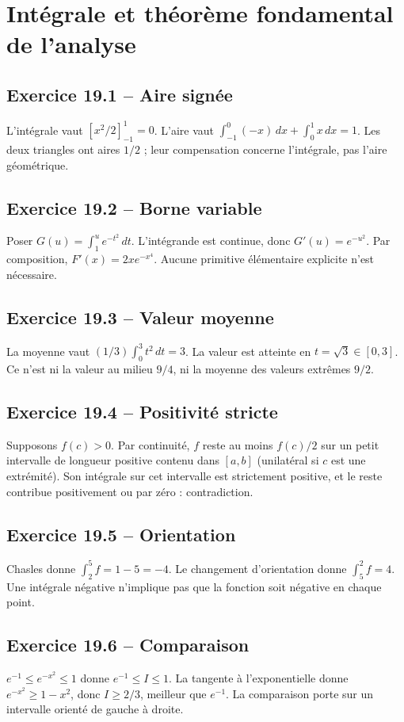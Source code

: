 \chapter{Intégrale et théorème fondamental de l’analyse}
\section*{Exercice 19.1 -- Aire signée}
L'intégrale vaut $[x^2/2]_{-1}^1=0$. L'aire vaut $\int_{-1}^0(-x)\,dx+\int_0^1x\,dx=1$. Les deux triangles ont aires $1/2$ ; leur compensation concerne l'intégrale, pas l'aire géométrique.

\section*{Exercice 19.2 -- Borne variable}
Poser $G(u)=\int_1^ue^{-t^2}\,dt$. L'intégrande est continue, donc $G'(u)=e^{-u^2}$. Par composition, $F'(x)=2xe^{-x^4}$. Aucune primitive élémentaire explicite n'est nécessaire.

\section*{Exercice 19.3 -- Valeur moyenne}
La moyenne vaut $(1/3)\int_0^3t^2\,dt=3$. La valeur est atteinte en $t=\sqrt3\in[0,3]$. Ce n'est ni la valeur au milieu $9/4$, ni la moyenne des valeurs extrêmes $9/2$.

\section*{Exercice 19.4 -- Positivité stricte}
Supposons $f(c)>0$. Par continuité, $f$ reste au moins $f(c)/2$ sur un petit intervalle de longueur positive contenu dans $[a,b]$ (unilatéral si $c$ est une extrémité). Son intégrale sur cet intervalle est strictement positive, et le reste contribue positivement ou par zéro : contradiction.

\section*{Exercice 19.5 -- Orientation}
Chasles donne $\int_2^5f=1-5=-4$. Le changement d'orientation donne $\int_5^2f=4$. Une intégrale négative n'implique pas que la fonction soit négative en chaque point.

\section*{Exercice 19.6 -- Comparaison}
$e^{-1}\le e^{-x^2}\le1$ donne $e^{-1}\le I\le1$. La tangente à l'exponentielle donne $e^{-x^2}\ge1-x^2$, donc $I\ge2/3$, meilleur que $e^{-1}$. La comparaison porte sur un intervalle orienté de gauche à droite.
